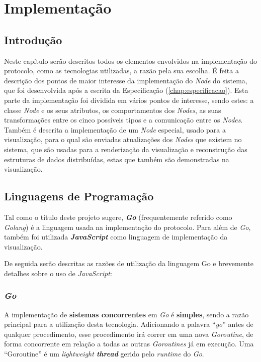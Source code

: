 \chapter{Implementação}
\label{chap:implementacao}

\section{Introdução}
\label{implementacao:sec:introducao}

Neste capítulo serão descritos todos os elementos envolvidos na implementação do protocolo,
como as tecnologias utilizadas, a razão pela sua escolha. É feita a descrição dos pontos de maior interesse da implementação do \emph{Node} do sistema, que foi desenvolvida após a escrita da Especificação (\ref{chap:especificacao}). 
Esta parte da implementação foi dividida em vários pontos de interesse, sendo estes: a classe \emph{Node} e os seus atributos, os comportamentos dos \emph{Nodes}, as suas transformações entre os cinco possíveis tipos e a comunicação entre os \emph{Nodes}.
Também é descrita a implementação de um \emph{Node} especial, usado para a visualização, para o qual são enviadas atualizações dos \emph{Nodes} que existem no sistema, que são usadas para a renderização da visualização e reconstrução das estruturas de dados distribuídas, estas que também são demonstradas na visualização.


\section{Linguagens de Programação}
\label{implementacao:sec:linguagens}
Tal como o título deste projeto sugere, \textbf{\emph{Go}} (frequentemente referido como \emph{Golang}) é a linguagem usada na implementação do protocolo. Para além de \emph{Go}, também foi utilizada \textbf{\emph{JavaScript}} como linguagem de implementação da visualização.

De seguida serão descritas as razões de utilização da linguagem Go e brevemente detalhes sobre o uso de \emph{JavaScript}:



\subsection*{\emph{Go}}

A implementação de \textbf{sistemas concorrentes} em \emph{Go} é \textbf{simples}, sendo a razão principal para a utilização desta tecnologia. 
Adicionando a palavra ``\emph{go}'' antes de qualquer procedimento, esse procedimento irá correr em uma nova \emph{Goroutine}, de forma concorrente em relação a todas as outras \emph{Goroutines} já em execução.
Uma ``Goroutine'' é um \emph{lightweight \textbf{thread}} gerido pelo \emph{runtime} do \emph{Go}.


